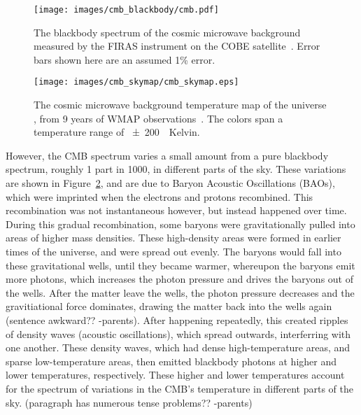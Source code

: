 \begin{figure}[!t]
  \centering
  \texttt{[image: images/cmb\_blackbody/cmb.pdf]}
  \caption[Cosmic Microwave Background Blackbody]{
    The blackbody spectrum of the cosmic microwave background measured by the FIRAS instrument on the COBE satellite~\cite{mather1990}.
    Error bars shown here are an assumed 1\% error.
  }
  \label{fig:cmb_black}
\end{figure}

\begin{figure}[ht]
  \centering
  \texttt{[image: images/cmb\_skymap/cmb\_skymap.eps]}
  \caption[Cosmic Microwave Background Skymap]{
    The cosmic microwave background temperature map of the universe \cite{wmap_skymap}, from 9 years of WMAP observations~\cite{wmap9year}.
    The colors span a temperature range of \SI{\pm200}{\mu{}Kelvin}.
  }
  \label{fig:cmb}
\end{figure}

However, the CMB spectrum varies a small amount from a pure blackbody spectrum, roughly 1 part in 1000, in different parts of the sky.
These variations are shown in Figure~\ref{fig:cmb}, and are due to Baryon Acoustic Oscillations (BAOs), which were imprinted when the electrons and protons recombined.
This recombination was not instantaneous however, but instead happened over time.
During this gradual recombination, some baryons were gravitationally pulled into areas of higher mass densities.
These high-density areas were formed in earlier times of the universe, and were spread out evenly.
The baryons would fall into these gravitational wells, until they became warmer, whereupon the baryons emit more photons, which increases the photon pressure and drives the baryons out of the wells.
After the matter leave the wells, the photon pressure decreases and the gravitiational force dominates, drawing the matter back into the wells again {\color{red}(sentence awkward?? -parents)}.
After happening repeatedly, this created ripples of density waves (acoustic oscillations), which spread outwards, interferring with one another.
These density waves, which had dense high-temperature areas, and sparse low-temperature areas, then emitted blackbody photons at higher and lower temperatures, respectively.
These higher and lower temperatures account for the spectrum of variations in the CMB's temperature in different parts of the sky.
{\color{red}(paragraph has numerous tense problems?? -parents)}

